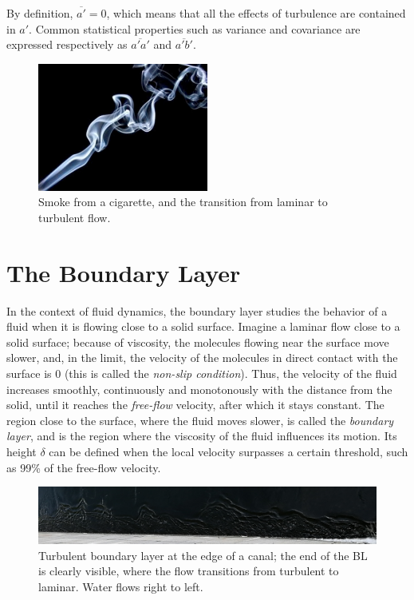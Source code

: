 \documentclass[12pt]{book}
\begin{document}
By definition, $\overline{a'}=0$, which means that all the effects of turbulence are contained in $a'$. Common statistical properties such as variance and covariance are expressed respectively as $\overline{a'a'}$ and $\overline{a'b'}$.

\begin{figure}
\caption{Smoke from a cigarette, and the transition from laminar to turbulent flow.}
\label{fig:smoke}
\centering
\includegraphics[width=0.5\textwidth]{images/smoke}
\end{figure}


\section{The Boundary Layer}
In the context of fluid dynamics, the boundary layer studies the behavior of a fluid when it is flowing close to a solid surface. Imagine a laminar flow close to a solid surface; because of viscosity, the molecules flowing near the surface move slower, and, in the limit, the velocity of the molecules in direct contact with the surface is 0 (this is called the \emph{non-slip condition}). Thus, the velocity of the fluid increases smoothly, continuously and monotonously with the distance from the solid, until it reaches the \emph{free-flow} velocity, after which it stays constant. The region close to the surface, where the fluid moves slower, is called the \emph{boundary layer}, and is the region where the viscosity of the fluid influences its motion. Its height $\delta$ can be defined when the local velocity surpasses a certain threshold, such as 99\% of the free-flow velocity.

\begin{figure}
\caption{Turbulent boundary layer at the edge of a canal; the end of the BL is clearly visible, where the flow transitions from turbulent to laminar. Water flows right to left.}
\label{fig:bl}
\centering
\includegraphics[width=\textwidth]{images/bl}
\end{figure}
\end{document}
